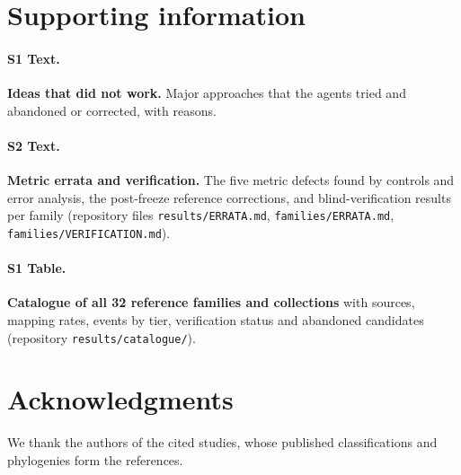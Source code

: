 \section*{Supporting information}

\paragraph*{S1 Text.}
\label{S1_Text}
\textbf{Ideas that did not work.} Major approaches that the agents tried and abandoned or corrected, with reasons.

\paragraph*{S2 Text.}
\label{S2_Text}
\textbf{Metric errata and verification.} The five metric defects found by controls and error analysis, the post-freeze reference
corrections, and blind-verification results per family (repository files \texttt{results/ERRATA.md},
\texttt{families/ERRATA.md}, \texttt{families/VERIFICATION.md}).

\paragraph*{S1 Table.}
\label{S1_Table}
\textbf{Catalogue of all 32 reference families and collections} with sources, mapping rates, events by tier,
verification status and abandoned candidates (repository \texttt{results/catalogue/}).

\section*{Acknowledgments}
We thank the authors of the cited studies, whose published classifications and phylogenies form the references.

\nolinenumbers




